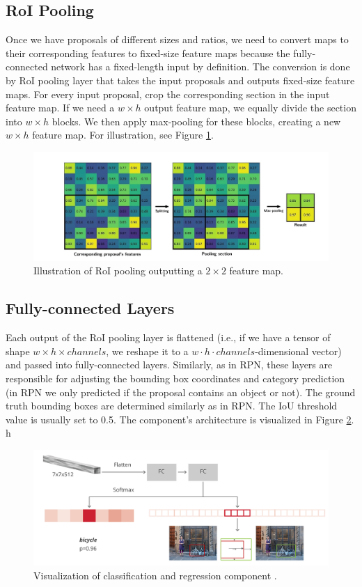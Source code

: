 \subsection{RoI Pooling}
Once we have proposals of different sizes and ratios, we need to convert maps to their corresponding features to fixed-size feature maps because the fully-connected network has a fixed-length input by definition. The conversion is done by RoI pooling layer that takes the input proposals and outputs fixed-size feature maps.  For every input proposal, crop the corresponding section in the input feature map. If we need a $w \times h$ output feature map, we equally divide the section into $w \times h$ blocks. We then apply max-pooling for these blocks, creating a new $w \times h$ feature map. For illustration, see Figure \ref{fig:roipooling}.
\begin{figure}[h]
    \centering
    \includegraphics[width=0.9\linewidth]{Sources/Figures/roi.png}
    \caption{Illustration of RoI pooling outputting a $2\times 2$ feature map. \cite{roipooling}}
    \label{fig:roipooling}
\end{figure}

\subsection{Fully-connected Layers}
Each output of the RoI pooling layer is flattened (i.e., if we have a tensor of shape $w \times h\times channels$, we reshape it to a $w \cdot h \cdot channels$-dimensional vector) and passed into fully-connected layers. Similarly, as in RPN, these layers are responsible for adjusting the bounding box coordinates and category prediction (in RPN we only predicted if the proposal contains an object or not). The ground truth bounding boxes are determined similarly as in RPN. The IoU threshold value is usually set to 0.5. The component's architecture is visualized in Figure \ref{fig:rcnn}.
h
\begin{figure}[h]
    \centering
    \includegraphics[width=0.8\linewidth]{Sources/Figures/rcnn-architecture.6732b9bd.png}
    \caption{Visualization of classification and regression component \cite{fasterrcnnhead}.}
    \label{fig:rcnn}
\end{figure}
 

